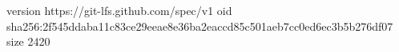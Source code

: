 version https://git-lfs.github.com/spec/v1
oid sha256:2f545ddaba11c83ce29eeae8e36ba2eaccd85c501aeb7cc0ed6ec3b5b276df07
size 2420
